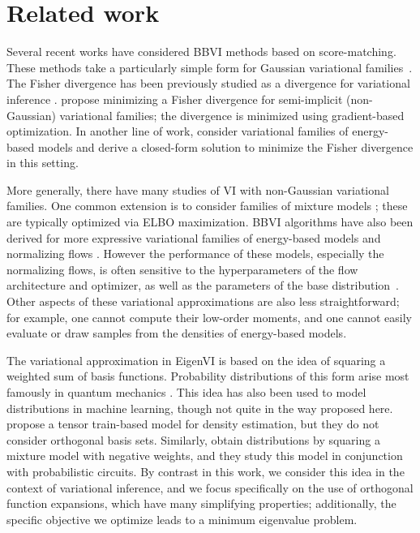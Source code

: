 
%

\section{Related work}
\label{sec:related}
\vspace{-4pt}

Several recent works have considered BBVI
methods based on score-matching.
These methods take a particularly simple form for
Gaussian variational families~\citep{modi2023,cai2024}.
%
The Fisher divergence \citep{hyvarinen2005estimation}
has been previously studied as a divergence
for variational inference \citep{yang2019variational}.
\citet{yu2023semiimplicit} propose minimizing a Fisher divergence
for semi-implicit (non-Gaussian) variational families; the divergence is minimized
using gradient-based optimization.
In another line of work,
\citet{zhang2018variational}
consider variational families of energy-based models
and derive a closed-form solution to minimize the Fisher divergence in this setting.

{More generally, there have many studies of VI with non-Gaussian variational families.
One common extension is to consider families of mixture models
\citep{guo2016boosting,miller2017variational,gershman2012nonparametric};
these are typically optimized via ELBO maximization.
}
BBVI algorithms have also been derived for
more expressive variational families of
energy-based models \citep{zhu1998filters,lecun2006tutorial,kim2016deep,dai2019kernel,lawson2019energy,zoltowski2021slice}
and normalizing flows
\citep{rezende2015variational,kingma2016improved,louizos2017multiplicative,berg2018sylvester,kobyzev2020normalizing,papamakarios2021normalizing}.
However the performance of these models, especially the normalizing flows, is often sensitive to the hyperparameters of the flow architecture and optimizer, as well as the parameters of the base distribution~\citep{dhaka2021challenges, agrawal2020advances}.
Other aspects of these variational approximations are also less straightforward; for example, one cannot compute their low-order moments, and one cannot easily evaluate or draw samples from the densities of energy-based models.

The variational approximation in EigenVI is based on the idea of squaring a weighted sum of basis functions. Probability distributions of this form arise most famously in quantum mechanics \citep{griffiths2018introduction}.
This idea has also been used to model distributions in machine learning, though not quite in the way proposed here.
\citet{novikov2021tensor} propose a tensor train-based model for density estimation, but they do not
consider orthogonal basis sets.
Similarly, \citet{loconte2024subtractive} obtain distributions by squaring a mixture model with
negative weights, and they study this model in conjunction with probabilistic circuits.
%
By contrast in this work, we consider this idea in the context of variational inference,
and we focus specifically on the use of orthogonal function expansions, which have many simplifying
properties;
additionally, the specific objective we optimize leads to a minimum eigenvalue problem.



%

